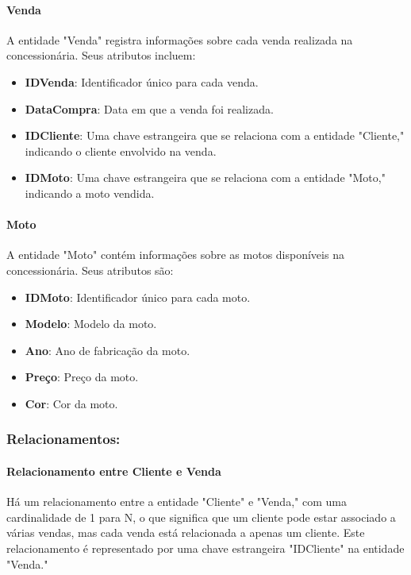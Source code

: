 \paragraph{Venda}

A entidade "Venda" registra informações sobre cada venda realizada na concessionária. Seus atributos incluem:

\begin{itemize}
	\item \textbf{IDVenda}: Identificador único para cada venda.
	\item \textbf{DataCompra}: Data em que a venda foi realizada.
	\item \textbf{IDCliente}: Uma chave estrangeira que se relaciona com a entidade "Cliente," indicando o cliente envolvido na venda.
	\item \textbf{IDMoto}: Uma chave estrangeira que se relaciona com a entidade "Moto," indicando a moto vendida.
\end{itemize}

\paragraph{Moto}

A entidade "Moto" contém informações sobre as motos disponíveis na concessionária. Seus atributos são:

\begin{itemize}
	\item \textbf{IDMoto}: Identificador único para cada moto.
	\item \textbf{Modelo}: Modelo da moto.
	\item \textbf{Ano}: Ano de fabricação da moto.
	\item \textbf{Preço}: Preço da moto.
	\item \textbf{Cor}: Cor da moto.
\end{itemize}

\subsubsection{Relacionamentos:}


\paragraph{Relacionamento entre Cliente e Venda}

Há um relacionamento entre a entidade "Cliente" e "Venda," com uma cardinalidade de 1 para N, o que significa que um cliente pode estar associado a várias vendas, mas cada venda está relacionada a apenas um cliente. Este relacionamento é representado por uma chave estrangeira "IDCliente" na entidade "Venda."

